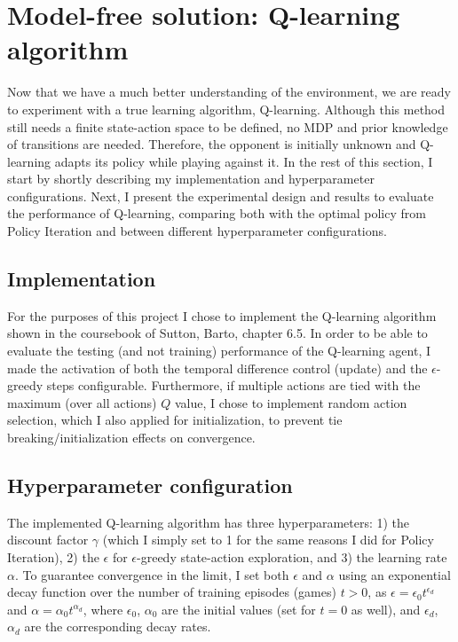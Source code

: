 \section{Model-free solution: Q-learning algorithm}

Now that we have a much better understanding of the environment, we are ready to experiment with a true learning algorithm, Q-learning. Although this method still needs a finite state-action space to be defined, no MDP and prior knowledge of transitions are needed. Therefore, the opponent is initially unknown and Q-learning adapts its policy while playing against it. In the rest of this section, I start by shortly describing my implementation and hyperparameter configurations. Next, I present the experimental design and results to evaluate the performance of Q-learning, comparing both with the optimal policy from Policy Iteration and between different hyperparameter configurations.

\subsection{Implementation}

For the purposes of this project I chose to implement the Q-learning algorithm shown in the coursebook of Sutton, Barto, chapter 6.5. In order to be able to evaluate the testing (and not training) performance of the Q-learning agent, I made the activation of both the temporal difference control (update) and the $\epsilon$-greedy steps configurable. Furthermore, if multiple actions are tied with the maximum (over all actions) $Q$ value, I chose to implement random action selection, which I also applied for initialization, to prevent tie breaking/initialization effects on convergence.

\subsection{Hyperparameter configuration}

The implemented Q-learning algorithm has three hyperparameters: 1) the discount factor $\gamma$ (which I simply set to 1 for the same reasons I did for Policy Iteration), 2) the $\epsilon$ for $\epsilon$-greedy state-action exploration, and 3) the learning rate $\alpha$. To guarantee convergence in the limit, I set both $\epsilon$ and $\alpha$ using an exponential decay function over the number of training episodes (games) $t>0$, as $\epsilon = \epsilon_0 t^{\epsilon_d}$ and $\alpha = \alpha_0 t^{\alpha_d}$, where $\epsilon_0$, $\alpha_0$ are the initial values (set for $t=0$ as well), and $\epsilon_d$, $\alpha_d$ are the corresponding decay rates. 

